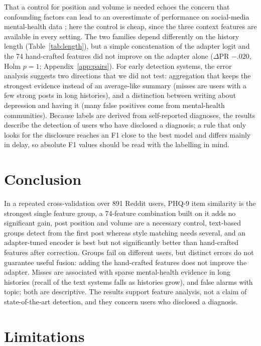 \documentclass[11pt]{article}
\begin{document}
That a control for position and volume is needed echoes the concern that confounding factors can lead to an overestimate of performance on social-media mental-health data \citep{harrigian-etal-2020-models}; here the control is cheap, since the three context features are available in every setting.
The two families depend differently on the history length (Table~\ref{tab:length}), but a simple concatenation of the adapter logit and the 74 hand-crafted features did not improve on the adapter alone ($\Delta$PR $-.020$, Holm $p=1$; Appendix~\ref{app:pairs}).
For early detection systems, the error analysis suggests two directions that we did not test: aggregation that keeps the strongest evidence instead of an average-like summary (misses are users with a few strong posts in long histories), and a distinction between writing about depression and having it (many false positives come from mental-health communities).
Because labels are derived from self-reported diagnoses, the results describe the detection of users who have disclosed a diagnosis; a rule that only looks for the disclosure reaches an F1 close to the best model and differs mainly in delay, so absolute F1 values should be read with the labelling in mind.

\section{Conclusion}

In a repeated cross-validation over 891 Reddit users, PHQ-9 item similarity is the strongest single feature group, a 74-feature combination built on it adds no significant gain, post position and volume are a necessary control, text-based groups detect from the first post whereas style matching needs several, and an adapter-tuned encoder is best but not significantly better than hand-crafted features after correction.
Groups fail on different users, but distinct errors do not guarantee useful fusion: adding the hand-crafted features does not improve the adapter.
Misses are associated with sparse mental-health evidence in long histories (recall of the text systems falls as histories grow), and false alarms with topic; both are descriptive.
The results support feature analysis, not a claim of state-of-the-art detection, and they concern users who disclosed a diagnosis.

\section*{Limitations}
\end{document}
